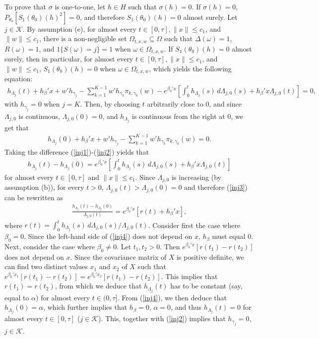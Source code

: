 \documentclass{statsoc}
\begin{document}
To prove that $\sigma$ is one-to-one, let $h\in H$ such that $\sigma(h)=0$. If $\sigma(h)=0$, $P_{\theta_0}\left[S_1(\theta_0)(h)^2\right]=0$, and therefore $S_1(\theta_0)(h)=0$ almost surely. Let $j\in\mathcal K$. By assumption (e), for almost every $t\in[0,\tau], \|x\|\leq c_1$, and $\|w\|\leq c_1$, there is a non-negligible set $\Omega_{t,x,w}\subseteq\Omega$ such that $\Delta(\omega)=1$, $R(\omega)=1$, and $1\{S(\omega)=j\}=1$ when $\omega\in\Omega_{t,x,w}$. If $S_1(\theta_0)(h)=0$ almost surely, then in particular, for almost every $t\in[0,\tau], \|x\|\leq c_1$, and $\|w\|\leq c_1$, $S_1(\theta_0)(h)=0$ when $\omega\in\Omega_{t,x,w}$, which yields the following equation:
\begin{eqnarray}\label{inj1}
h_{\Lambda_j}(t)+h_\beta'x+w'h_{\gamma_j}-\sum_{k=1}^{K-1}w'h_{\gamma_k}\pi_{k,\gamma_0}(w)-e^{\beta_0'x}\left[\int_0^t h_{\Lambda_j}(s)\,d\Lambda_{j,0}(s)+h_\beta'x \Lambda_{j,0}(t)\right]=0,
\end{eqnarray}
with $h_{\gamma_j}=0$ when $j=K$. Then, by choosing $t$ arbitrarily close to 0, and since $\Lambda_{j,0}$ is continuous, $\Lambda_{j,0}(0)=0$, and $h_{\Lambda_j}$ is continuous from the right at 0, we get that
\begin{eqnarray}\label{inj2}
h_{\Lambda_j}(0)+h_\beta'x+w'h_{\gamma_j}-\sum_{k=1}^{K-1}w'h_{\gamma_k}\pi_{k,\gamma_0}(w)=0.
\end{eqnarray}
Taking the difference (\ref{inj1})-(\ref{inj2}) yields that
\begin{eqnarray}\label{inj3}
h_{\Lambda_j}(t)-h_{\Lambda_j}(0)=e^{\beta_0'x}\left[\int_0^t h_{\Lambda_j}(s)\,d\Lambda_{j,0}(s)+h_\beta'x \Lambda_{j,0}(t)\right]
\end{eqnarray}
for almost every $t\in[0,\tau]$ and $\|x\|\leq c_1$. Since $\Lambda_{j,0}$ is increasing (by assumption (b)), for every $t>0$, $\Lambda_{j,0}(t)>\Lambda_{j,0}(0)=0$ and therefore (\ref{inj3}) can be rewritten as
\begin{eqnarray}\label{inj4}
\frac{h_{\Lambda_j}(t)-h_{\Lambda_j}(0)}{\Lambda_{j,0}(t)}=e^{\beta_0'x}\left[r(t)+h_\beta'x \right],
\end{eqnarray}
where $r(t)=\int_0^t h_{\Lambda_j}(s)\,d\Lambda_{j,0}(s)\slash\Lambda_{j,0}(t)$. Consider first the case where $\beta_0=0$. Since the left-hand side of (\ref{inj4}) does not depend on $x$, $h_\beta$ must equal 0. Next, consider the case where $\beta_0\neq 0$. Let $t_1, t_2>0$. Then $e^{\beta_0'x}[r(t_1)-r(t_2)]$ does not depend on $x$. Since the covariance matrix of $X$ is positive definite, we can find two distinct values $x_1$ and $x_2$ of $X$ such that $e^{\beta_0'x_1}[r(t_1)-r(t_2)]=e^{\beta_0'x_2}[r(t_1)-r(t_2)]$. This implies that $r(t_1)=r(t_2)$, from which we deduce that $h_{\Lambda_j}(t)$ has to be constant (say, equal to $\alpha$) for almost every $t\in(0,\tau]$. From (\ref{inj4}), we then deduce that $h_{\Lambda_j}(0)=\alpha$, which further implies that $h_\beta=0$, $\alpha=0$, and thus $h_{\Lambda_j}(t)=0$ for almost every $t\in[0,\tau]$ ($j\in\mathcal K$). This, together with (\ref{inj2}) implies that $h_{\gamma_j}=0$, $j\in\mathcal K$.
\end{document}
